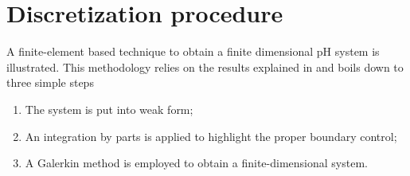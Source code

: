\section{Discretization procedure}
\label{sec:discr}
A finite-element based technique to obtain a finite dimensional pH system is illustrated. This methodology relies on the results explained in \cite{cardoso2019partitioned} and boils down to three simple steps
\begin{enumerate}
	\item The system is put into weak form; 
	\item An integration by parts is applied to highlight the proper boundary control;
	\item A Galerkin method is employed to obtain a finite-dimensional system.
\end{enumerate}

